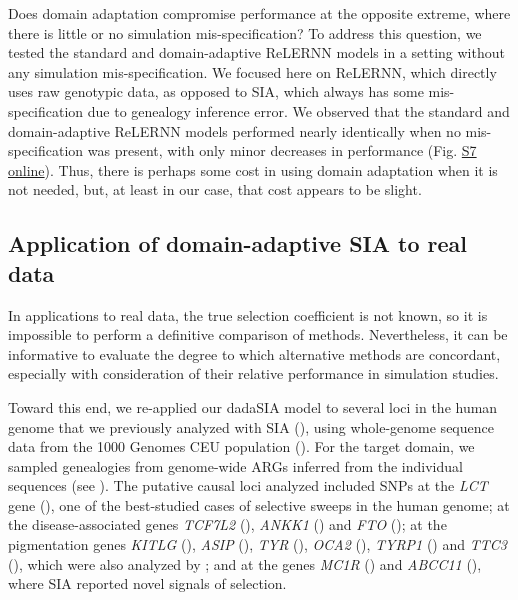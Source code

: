 Does domain adaptation compromise performance at the opposite extreme, where there is little or no simulation mis-specification? To address this question, we tested the standard and domain-adaptive ReLERNN models in a setting without any simulation mis-specification. We focused here on ReLERNN, which directly uses raw genotypic data, as opposed to SIA, which always has some mis-specification due to genealogy inference error. We observed that the standard and domain-adaptive ReLERNN models performed nearly identically when no mis-specification was present, with only minor decreases in performance (Fig. \href{https://journals.plos.org/plosgenetics/article?id=10.1371/journal.pgen.1011032#sec018}{S7 online}). Thus, there is perhaps some cost in using domain adaptation when it is not needed, but, at least in our case, that cost appears to be slight.

\subsection{Application of domain-adaptive \ac{SIA} to real data}
In applications to real data, the true selection coefficient is not known, so it is impossible to perform a definitive comparison of methods. Nevertheless, it can be informative to evaluate the degree to which alternative methods are concordant, especially with consideration of their relative performance in simulation studies.

Toward this end, we re-applied our \acf{dadaSIA} model to several loci in the human genome that we previously analyzed with \ac{SIA} (\cite{hejase_deep-learning_2022}), using whole-genome sequence data from the 1000 Genomes CEU population (\cite{auton_global_2015}). For the target domain, we sampled genealogies from genome-wide \acp{ARG} inferred from the individual sequences (see ). The putative causal loci analyzed included \acp{SNP} at the \textit{LCT} gene (\cite{bersaglieri_genetic_2004}), one of the best-studied cases of selective sweeps in the human genome; at the disease-associated genes \textit{TCF7L2} (\cite{lyssenko_mechanisms_2007}), \textit{ANKK1} (\cite{spellicy_variant_2014}) and \textit{FTO} (\cite{frayling_common_2007}); at the pigmentation genes \textit{KITLG} (\cite{sulem_genetic_2007}), \textit{ASIP} (\cite{eriksson_web-based_2010}), \textit{TYR} (\cite{sulem_genetic_2007,eriksson_web-based_2010}), \textit{OCA2} (\cite{han_genome-wide_2008,sturm_single_2008}), \textit{TYRP1} (\cite{kenny_melanesian_2012}) and \textit{TTC3} (\cite{liu_digital_2010}), which were also analyzed by \cite{stern_approximate_2019}; and at the genes \textit{MC1R} (\cite{sulem_genetic_2007,han_genome-wide_2008}) and \textit{ABCC11} (\cite{yoshiura_snp_2006}), where \ac{SIA} reported novel signals of selection.


